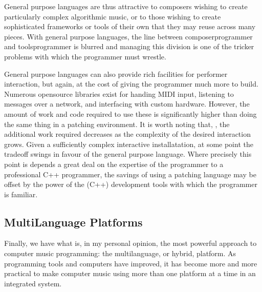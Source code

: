 \documentclass[letterpaper,10pt,english]{sphinxmanual}
\begin{document}
\sphinxAtStartPar
General purpose languages are thus attractive to composers wishing
to create particularly complex algorithmic music, or to those wishing to create sophisticated
frameworks or tools of their own that they may reuse across many pieces.
With general purpose languages, the line between composer\sphinxhyphen{}programmer and tools\sphinxhyphen{}programmer
is blurred and managing this division is one of the tricker problems
with which the programmer must wrestle.

\sphinxAtStartPar
General purpose languages can also provide rich facilities for
performer interaction, but again, at the cost of giving the programmer much more
to build. Numerous open\sphinxhyphen{}source libraries exist for handing MIDI input, listening to
messages over a network, and interfacing with custom hardware.
However, the amount of work and code required to use these is significantly
higher than doing the same thing in a patching environment.
It is worth noting that, , the additional work required decreases as the complexity
of the desired interaction grows. Given a sufficiently complex interactive
installatation, at some point the tradeoff swings in favour of the general
purpose language. Where precisely this point is depends a great deal
on the expertise of the programmer \sphinxhyphen{} to a professional C++ programmer, the
savings of using a patching language may be offset by the power of the
(C++) development tools with which the programmer is familiar.


\subsection{Multi\sphinxhyphen{}Language Platforms}
\label{\detokenize{background:multi-language-platforms}}
\sphinxAtStartPar
Finally, we have what is, in my personal opinion, the most powerful approach to computer music programming:
the multi\sphinxhyphen{}language, or hybrid, platform.
As programming tools and computers have improved, it has become more and more practical to make computer
music using more than one platform at a time in an integrated system.
\end{document}
